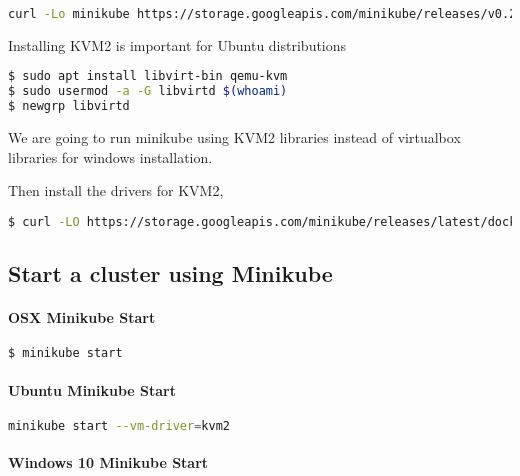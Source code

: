 \begin{lstlisting}[language=bash]
curl -Lo minikube https://storage.googleapis.com/minikube/releases/v0.25.0/minikube-linux-amd64 && chmod +x minikube && sudo mv minikube /usr/local/bin/
\end{lstlisting}

Installing KVM2 is important for Ubuntu distributions

\begin{lstlisting}[language=bash]
$ sudo apt install libvirt-bin qemu-kvm
$ sudo usermod -a -G libvirtd $(whoami)
$ newgrp libvirtd
\end{lstlisting}

We are going to run minikube using KVM2 libraries instead of virtualbox
libraries for windows installation.

Then install the drivers for KVM2,

\begin{lstlisting}[language=bash]
$ curl -LO https://storage.googleapis.com/minikube/releases/latest/docker-machine-driver-kvm2 && chmod +x docker-machine-driver-kvm2 && sudo mv docker-machine-driver-kvm2 /usr/bin/
\end{lstlisting}

\subsection{Start a cluster using Minikube}

\paragraph{OSX Minikube Start}

\begin{lstlisting}[language=bash]
$ minikube start
\end{lstlisting}

\paragraph{Ubuntu Minikube Start}

\begin{lstlisting}[language=bash]
minikube start --vm-driver=kvm2
\end{lstlisting}

\paragraph{Windows 10 Minikube Start}

